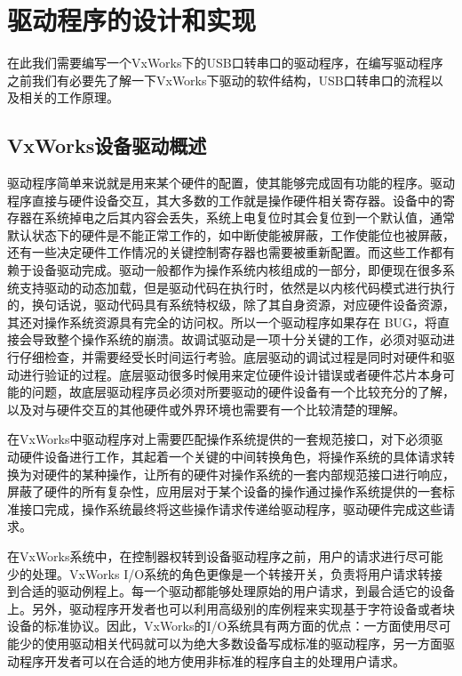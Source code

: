 

\chapter{驱动程序的设计和实现}
	在此我们需要编写一个VxWorks下的USB口转串口的驱动程序，在编写驱动程序之前我们有必要先了解一下VxWorks下驱动的软件结构，USB口转串口的流程以及相关的工作原理。
\section{VxWorks设备驱动概述}
	驱动程序简单来说就是用来某个硬件的配置，使其能够完成固有功能的程序。驱动程序直接与硬件设备交互，其大多数的工作就是操作硬件相关寄存器。设备中的寄存器在系统掉电之后其内容会丢失，系统上电复位时其会复位到一个默认值，通常默认状态下的硬件是不能正常工作的，如中断使能被屏蔽，工作使能位也被屏蔽，还有一些决定硬件工作情况的关键控制寄存器也需要被重新配置。而这些工作都有赖于设备驱动完成。驱动一般都作为操作系统内核组成的一部分，即便现在很多系统支持驱动的动态加载，但是驱动代码在执行时，依然是以内核代码模式进行执行的，换句话说，驱动代码具有系统特权级，除了其自身资源，对应硬件设备资源，其还对操作系统资源具有完全的访问权。所以一个驱动程序如果存在 BUG，将直接会导致整个操作系统的崩溃。故调试驱动是一项十分关键的工作，必须对驱动进行仔细检查，并需要经受长时间运行考验。底层驱动的调试过程是同时对硬件和驱动进行验证的过程。底层驱动很多时候用来定位硬件设计错误或者硬件芯片本身可能的问题，故底层驱动程序员必须对所要驱动的硬件设备有一个比较充分的了解，以及对与硬件交互的其他硬件或外界环境也需要有一个比较清楚的理解。
	
	在VxWorks中驱动程序对上需要匹配操作系统提供的一套规范接口，对下必须驱动硬件设备进行工作，其起着一个关键的中间转换角色，将操作系统的具体请求转换为对硬件的某种操作，让所有的硬件对操作系统的一套内部规范接口进行响应，屏蔽了硬件的所有复杂性，应用层对于某个设备的操作通过操作系统提供的一套标准接口完成，操作系统最终将这些操作请求传递给驱动程序，驱动硬件完成这些请求。	
	
	在VxWorks系统中，在控制器权转到设备驱动程序之前，用户的请求进行尽可能少的处理。VxWorks I/O系统的角色更像是一个转接开关，负责将用户请求转接到合适的驱动例程上。每一个驱动都能够处理原始的用户请求，到最合适它的设备上。另外，驱动程序开发者也可以利用高级别的库例程来实现基于字符设备或者块设备的标准协议。因此，VxWorks的I/O系统具有两方面的优点：一方面使用尽可能少的使用驱动相关代码就可以为绝大多数设备写成标准的驱动程序，另一方面驱动程序开发者可以在合适的地方使用非标准的程序自主的处理用户请求。

